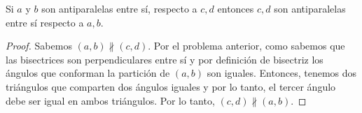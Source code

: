 
\begin{problema}
	Si $a$ y $b$ son antiparalelas entre sí, respecto a $c,d$ entonces $c,d$ son antiparalelas entre sí respecto a $a,b$. 
\end{problema}
\begin{proof}
	Sabemos $(a,b)\not \parallel (c,d)$. Por el problema anterior, como sabemos que las bisectrices son perpendiculares entre sí y por definición de bisectriz los ángulos que conforman la partición de $(a,b)$ son iguales. Entonces, tenemos dos triángulos que comparten dos ángulos iguales y por lo tanto, el tercer ángulo debe ser igual en ambos triángulos. Por lo tanto, $(c,d)\not \parallel (a,b)$.
\end{proof}






